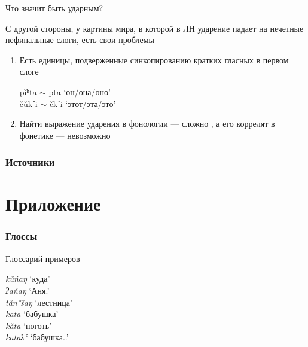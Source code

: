 \documentclass[10 pt, handout]{beamer}
\begin{document}
\begin{frame}{Что значит быть ударным?}

	С другой стороны, у картины мира, в которой в ЛН ударение падает на нечетные нефинальные слоги, есть свои проблемы
	\vspace*{1em}
	
	\begin{enumerate}[\ding{104}]
		\item Есть единицы, подверженные синкопированию кратких гласных в первом слоге
		
\ex
	pĭʰta $\sim$ pta \hfill `он/она/оно'\\
	čŭkˊi $\sim$ čkˊi \hfill `этот/эта/это'
\xe

		\item Найти выражение ударения в фонологии --- сложно \parencite{belov-shikunova2023, shikunova2024}, а его коррелят в фонетике --- невозможно
	\end{enumerate}

\end{frame}

%
%

\begin{frame}[allowframebreaks]
\frametitle{Источники}
%
\printbibliography
\end{frame}

\section{Приложение}

\begin{frame}
\frametitle{Глоссы}
\printglossary[title={}, style=mcolindex, nonumberlist]
\end{frame}

\begin{frame}{Глоссарий примеров}

	    	\emph{kŭńaŋ} \hfill `куда' \\
	    	\emph{ʔańaŋ} \hfill `Аня.{\Gen}' \\
	    	\emph{tăn°šaŋ} \hfill `лестница' \\
    	\emph{kata} \hfill `бабушка'\\
	    	\emph{kăta} \hfill `ноготь'\\
    	\emph{kataλ°} \hfill `бабушка.{\Poss}.{\Ssg}'\\

\end{frame} 
\end{document}
